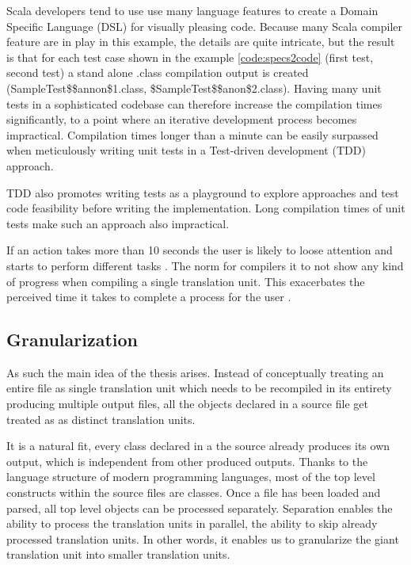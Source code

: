 \documentclass{VUMIFPSbakalaurinis}
\begin{document}


Scala developers tend to use use many language features to create a Domain Specific Language (DSL) for visually pleasing code.
Because many Scala compiler feature are in play in this example, the details are quite intricate, but the result is that for each test case shown in the example \ref{code:specs2code} (first test, second test) a stand alone .class compilation output is created (SampleTest\$\$annon\$1.class, \$SampleTest\$\$anon\$2.class).
Having many unit tests in a sophisticated codebase can therefore increase the compilation times significantly, to a point where an iterative development process becomes impractical.
Compilation times longer than a minute can be easily surpassed when meticulously writing unit tests in a Test-driven development (TDD) approach.

TDD also promotes writing tests as a playground to explore approaches and test code feasibility before writing the implementation.
Long compilation times of unit tests make such an approach also impractical.

If an action takes more than 10 seconds the user is likely to loose attention and starts to perform different tasks \cite{Usability}.
The norm for compilers it to not show any kind of progress when compiling a single translation unit.
This exacerbates the perceived time it takes to complete a process for the user \cite{Usability}.

\subsection{Granularization}

As such the main idea of the thesis arises.
Instead of conceptually treating an entire file as single translation unit which needs to be recompiled in its entirety producing multiple output files, all the objects declared in a source file get treated as as distinct translation units.

It is a natural fit, every class declared in a the source already produces its own output, which is independent from other produced outputs.
Thanks to the language structure of modern programming languages, most of the top level constructs within the source files are classes.
Once a file has been loaded and parsed, all top level objects can be processed separately.
Separation enables the ability to process the translation units in parallel, the ability to skip already processed translation units. In other words, it enables us to granularize the giant translation unit into smaller translation units.
\end{document}
